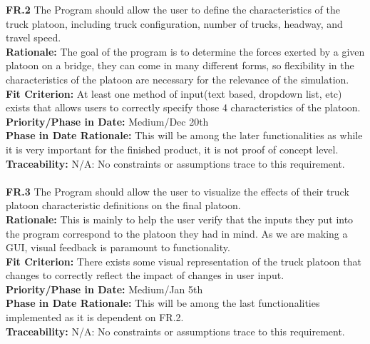 \documentclass[12pt]{article}
\begin{document}
  \noindent\textbf{FR.2} The Program should allow the user to define the characteristics of the truck platoon, including truck configuration, number of trucks, headway, and travel speed.\\
  \textbf{Rationale:} The goal of the program is to determine the forces exerted by a given platoon on a bridge, they can come in many different forms, so flexibility in the characteristics
  of the platoon are necessary for the relevance of the simulation.\\ 
  \textbf{Fit Criterion:} At least one method of input(text based, dropdown list, etc) exists that allows users to correctly specify those 4 characteristics of the platoon.\\
  \textbf{Priority/Phase in Date:} Medium/Dec 20th\\
  \textbf{Phase in Date Rationale:} This will be among the later functionalities as while it is very important for the finished product, it is not proof of concept level.\\
  \textbf{Traceability:} N/A: No constraints or assumptions trace to this requirement.\\\\

  \noindent\textbf{FR.3} The Program should allow the user to visualize the effects of their truck platoon characteristic definitions on the final platoon.\\
  \textbf{Rationale:} This is mainly to help the user verify that the inputs they put into the program correspond to the platoon they had in mind. As we are making a GUI,
  visual feedback is paramount to functionality.\\
  \textbf{Fit Criterion:} There exists some visual representation of the truck platoon that changes to correctly reflect the impact of changes in user input.\\
  \textbf{Priority/Phase in Date:} Medium/Jan 5th\\
  \textbf{Phase in Date Rationale:} This will be among the last functionalities implemented as it is dependent on FR.2.\\
  \textbf{Traceability:} N/A: No constraints or assumptions trace to this requirement.\\\\
\end{document}
